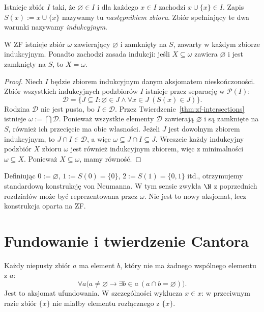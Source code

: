 \begin{definicja}\label{def:zf-infinity}
Istnieje zbiór $I$ taki, że $\varnothing\in I$ i dla
każdego $x\in I$ zachodzi $x\cup\{x\}\in I$.
Zapis $S(x):=x\cup\{x\}$ nazywamy tu \emph{następnikiem zbioru}.
Zbiór spełniający te dwa warunki nazywamy \emph{indukcyjnym}.
\end{definicja}

\begin{twierdzenie}
\label{thm:zf-omega}
W ZF istnieje zbiór $\omega$ zawierający $\varnothing$
i zamknięty na $S$, zawarty w każdym zbiorze indukcyjnym.
Ponadto zachodzi zasada indukcji: jeśli $X\subseteq\omega$
zawiera $\varnothing$ i jest zamknięty na $S$, to $X=\omega$.
\end{twierdzenie}
\begin{proof}
Niech $I$ będzie zbiorem indukcyjnym danym aksjomatem
nieskończoności. Zbiór wszystkich indukcyjnych podzbiorów
$I$ istnieje przez separację w $\mathcal P(I)$:
\[
 \mathcal D=\{J\subseteq I:\varnothing\in J\land
 \forall x\in J\ (S(x)\in J)\}.
\]
Rodzina $\mathcal D$ nie jest pusta, bo $I\in\mathcal D$.
Przez Twierdzenie~\ref{thm:zf-intersections} istnieje
$\omega:=\bigcap\mathcal D$. Ponieważ wszystkie elementy
$\mathcal D$ zawierają $\varnothing$ i są zamknięte na $S$,
również ich przecięcie ma obie własności. Jeżeli $J$ jest
dowolnym zbiorem indukcyjnym, to $J\cap I\in\mathcal D$,
a więc $\omega\subseteq J\cap I\subseteq J$.
Wreszcie każdy indukcyjny podzbiór $X$ zbioru $\omega$
jest również indukcyjnym zbiorem, więc z minimalności
$\omega\subseteq X$. Ponieważ $X\subseteq\omega$, mamy równość.
\end{proof}

\begin{uwaga}
Definiując $0:=\varnothing$, $1:=S(0)=\{0\}$,
$2:=S(1)=\{0,1\}$ itd., otrzymujemy standardową
konstrukcję von Neumanna. W tym sensie zwykła $\N$
z poprzednich rozdziałów może być reprezentowana przez $\omega$.
Nie jest to nowy aksjomat, lecz konstrukcja oparta na ZF.
\end{uwaga}

\section{Fundowanie i twierdzenie Cantora}
\begin{definicja}
\label{def:zf-foundation}
Każdy niepusty zbiór $a$ ma element $b$, który nie ma
żadnego wspólnego elementu z $a$:
\[
 \forall a\bigl(a\ne\varnothing\to
 \exists b\in a\ (a\cap b=\varnothing)\bigr).
\]
Jest to aksjomat ufundowania. W szczególności wyklucza
$x\in x$: w przeciwnym razie zbiór $\{x\}$
nie miałby elementu rozłącznego z $\{x\}$.
\end{definicja}

